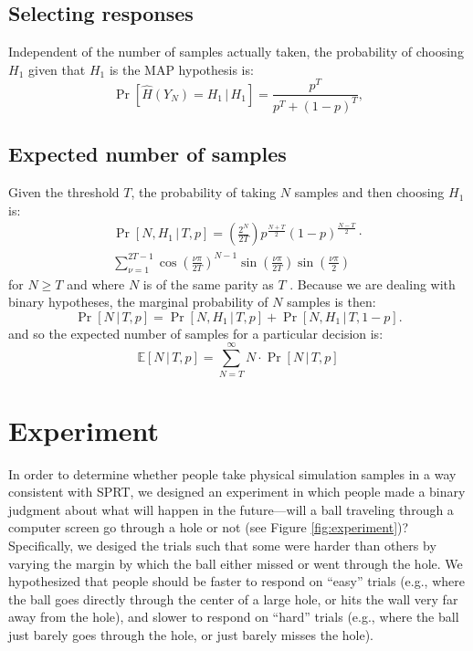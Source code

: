 \documentclass[10pt,letterpaper]{article}
\begin{document}
\subsection{Selecting responses} 

Independent of the number of samples actually taken, the probability of choosing $H_1$ given that $H_1$ is the MAP hypothesis is:
\begin{equation}
\Pr[\hat{H}(Y_N)=H_1\,|\,H_1]=\frac{p^T}{p^T+(1-p)^T},
\label{eq:pr-choose-h1}
\end{equation}

\subsection{Expected number of samples} 

Given the threshold $T$, the probability of taking $N$ samples and then choosing $H_1$ is:
\begin{multline}
\Pr[N,H_1\,|\,T,p]=\left(\frac{2^N}{2T}\right)p^{\frac{N+T}{2}}(1-p)^{\frac{N-T}{2}}\cdot{}\\
\sum_{\nu=1}^{2T-1}\cos\left(\frac{\nu\pi}{2T}\right)^{N-1}\sin\left(\frac{\nu\pi}{2T}\right)\sin\left(\frac{\nu\pi}{2}\right)
\end{multline}
for $N\geq T$ and where $N$ is of the same parity as $T$ \cite[ch.~XIV, eq. 5.7]{Feller:1968ut}. 
Because we are dealing with binary hypotheses, the marginal probability of $N$ samples is then:
\begin{equation}
\Pr[N\,|\,T,p]=\Pr[N,H_1\,|\,T,p]+\Pr[N,H_1\,|\,T,1-p].
\label{eq:pr-n}
\end{equation}
and so the expected number of samples for a particular decision is:
\begin{equation}
\mathbb{E}[N\,|\,T,p]=\sum_{N=T}^\infty N\cdot{}\Pr[N\,|\,T,p]
\label{eq:expsamp}
\end{equation}

\section{Experiment}

In order to determine whether people take physical simulation samples in a way consistent with SPRT, we designed an experiment in which people made a binary judgment about what will happen in the future---will a ball traveling through a computer screen go through a hole or not (see Figure \ref{fig:experiment})?
Specifically, we desiged the trials such that some were harder than others by varying the margin by which the ball either missed or went through the hole.
We hypothesized that people should be faster to respond on ``easy'' trials (e.g., where the ball goes directly through the center of a large hole, or hits the wall very far away from the hole), and slower to respond on ``hard'' trials (e.g., where the ball just barely goes through the hole, or just barely misses the hole).
\end{document}
